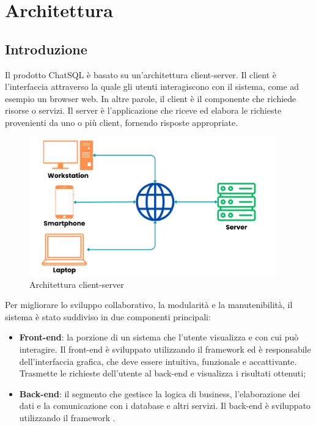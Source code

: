\section{Architettura}

\subsection{Introduzione}
\par Il prodotto ChatSQL è basato su un'architettura client-server. Il client è l'interfaccia attraverso la quale gli utenti interagiscono con il sistema, come ad esempio un browser web. In altre parole, il client è il componente che richiede risorse o servizi. Il server è l'applicazione che riceve ed elabora le richieste provenienti da uno o più client, fornendo risposte appropriate.

\begin{figure}[H]
  \centering
  \includegraphics[width=0.95\textwidth]{assets/client_server.png}
  \caption{Architettura client-server}
\end{figure}

\par Per migliorare lo sviluppo collaborativo, la modularità e la manutenibilità, il sistema è stato suddiviso in due componenti principali:
\begin{itemize}
  \item \textbf{Front-end}: la porzione di un sistema che l'utente visualizza e con cui può interagire. Il front-end è sviluppato utilizzando il framework  ed è responsabile dell'interfaccia grafica, che deve essere intuitiva, funzionale e accattivante. Trasmette le richieste dell'utente al back-end e visualizza i risultati ottenuti;
  \item \textbf{Back-end}: il segmento che gestisce la logica di business, l'elaborazione dei dati e la comunicazione con i database e altri servizi. Il back-end è sviluppato utilizzando il framework .
\end{itemize}

